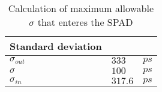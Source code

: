 \begin{table}[h]
\centering
\caption{Calculation of maximum allowable $\sigma$ that enteres the SPAD}
\label{tab:sigma_SPAD}
\begin{tabular}{|l|ll|} \hline
\textbf{Standard deviation} &         &      \\ \hline
$\sigma_{out}$              & $333$   & $ps$ \\
$\sigma$                    & $100$   & $ps$ \\
$\sigma_{in}$               & $317.6$ & $ps$ \\ \hline
\end{tabular}
\end{table}